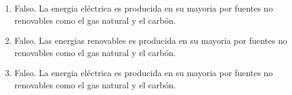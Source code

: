 
\begin{solution}
	
\begin{enumerate}[label=\alph*)]
	\item{}

		\textcolor{samuraiRed}{Falso.} La energia eléctrica es producida en su mayoria 
		por fuentes no renovables como el gas natural y el carbón.
\vspace{1em}
	\item{}

		\textcolor{samuraiRed}{Falso.} Las energias renovables es producida en su mayoria 
		por fuentes no renovables como el gas natural y el carbón.
\vspace{1em}

	\item{}

		\textcolor{samuraiRed}{Falso.} La energia eléctrica es producida en su mayoria 
		por fuentes no renovables como el gas natural y el carbón.
\vspace{1em}
\end{enumerate}

\end{solution}

\boldit
